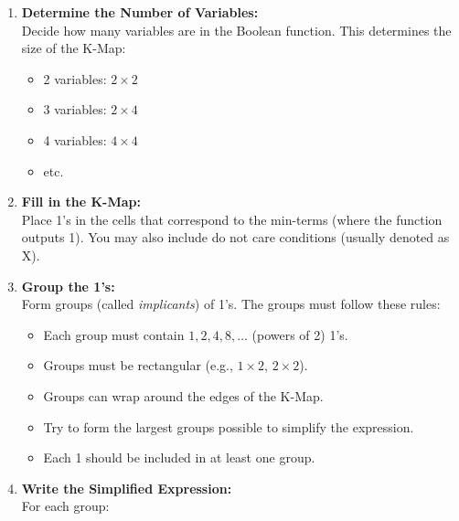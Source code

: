 \begin{enumerate}
	
	\item \textbf{Determine the Number of Variables:} \\
	      Decide how many variables are in the Boolean function. This determines the size of the K-Map:
	      
		\begin{itemize}
		 
			\item 2 variables: \(2 \times 2\)
		 	
			\item 3 variables: \(2 \times 4\)
		 
			\item 4 variables: \(4 \times 4\)
		 
			\item etc.
	  
		\end{itemize}

	\item \textbf{Fill in the K-Map:} \\
	      Place 1's in the cells that correspond to the min-terms (where the function outputs 1). You 
		  may also include do not care conditions (usually denoted as \(\)X\(\)).

	\item \textbf{Group the 1's:} \\
	      Form groups (called \emph{implicants}) of 1's. The groups must follow these rules:
	      
		\begin{itemize}
		 
			\item Each group must contain \(1, 2, 4, 8, \ldots\) (powers of 2) 1's.
		 
			\item Groups must be rectangular (e.g., \(1 \times 2\), \(2 \times 2\)).
		 
			\item Groups can wrap around the edges of the K-Map.
		 
			\item Try to form the largest groups possible to simplify the expression.
		 
			\item Each 1 should be included in at least one group.
	 
		\end{itemize}

	\item \textbf{Write the Simplified Expression:} \\
	      For each group:


\end{enumerate}
